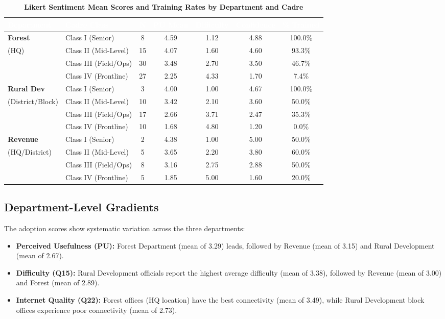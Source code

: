 \documentclass[10pt,a4paper]{article}
\begin{document}
\begin{table}[h!]
\centering
\footnotesize
\caption{\textbf{Likert Sentiment Mean Scores and Training Rates by Department and Cadre}}
\vspace{0.1cm}
\begin{tabularx}{\textwidth}{l X c c c c c}
\toprule
\rowcolor{navyblue}
\textcolor{white}{\textbf{Department}} & \textcolor{white}{\textbf{Cadre Class}} & \textcolor{white}{\textbf{N}} & \textcolor{white}{\textbf{PU Mean}} & \textcolor{white}{\textbf{Difficulty}} & \textcolor{white}{\textbf{Confidence}} & \textcolor{white}{\textbf{\% Trained}} \\
\midrule
\textbf{Forest} & Class I (Senior) & 8 & 4.59 & 1.12 & 4.88 & 100.0\% \\
(HQ) & Class II (Mid-Level) & 15 & 4.07 & 1.60 & 4.60 & 93.3\% \\
 & Class III (Field/Ops) & 30 & 3.48 & 2.70 & 3.50 & 46.7\% \\
 & Class IV (Frontline) & 27 & 2.25 & 4.33 & 1.70 & 7.4\% \\
\midrule
\textbf{Rural Dev} & Class I (Senior) & 3 & 4.00 & 1.00 & 4.67 & 100.0\% \\
(District/Block) & Class II (Mid-Level) & 10 & 3.42 & 2.10 & 3.60 & 50.0\% \\
 & Class III (Field/Ops) & 17 & 2.66 & 3.71 & 2.47 & 35.3\% \\
 & Class IV (Frontline) & 10 & 1.68 & 4.80 & 1.20 & 0.0\% \\
\midrule
\textbf{Revenue} & Class I (Senior) & 2 & 4.38 & 1.00 & 5.00 & 50.0\% \\
(HQ/District) & Class II (Mid-Level) & 5 & 3.65 & 2.20 & 3.80 & 60.0\% \\
 & Class III (Field/Ops) & 8 & 3.16 & 2.75 & 2.88 & 50.0\% \\
 & Class IV (Frontline) & 5 & 1.85 & 5.00 & 1.60 & 20.0\% \\
\bottomrule
\end{tabularx}
\end{table}

\subsection{Department-Level Gradients}
The adoption scores show systematic variation across the three departments:
\begin{itemize}
  \item \textbf{Perceived Usefulness (PU):} Forest Department (mean of 3.29) leads, followed by Revenue (mean of 3.15) and Rural Development (mean of 2.67).
  \item \textbf{Difficulty (Q15):} Rural Development officials report the highest average difficulty (mean of 3.38), followed by Revenue (mean of 3.00) and Forest (mean of 2.89).
  \item \textbf{Internet Quality (Q22):} Forest offices (HQ location) have the best connectivity (mean of 3.49), while Rural Development block offices experience poor connectivity (mean of 2.73).
\end{itemize}
\end{document}

